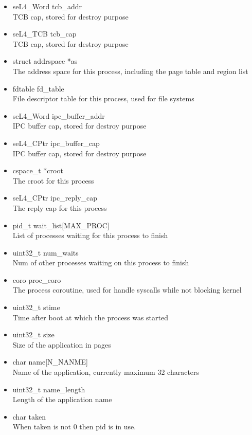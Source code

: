\documentclass[12pt]{article}
\begin{document}
\begin{itemize}
\item seL4\_Word tcb\_addr\\
TCB cap, stored for destroy purpose
\item seL4\_TCB tcb\_cap\\
TCB cap, stored for destroy purpose
\item struct addrspace *as\\
The address space for this process, including the page table and region list
\item fdtable fd\_table\\
File descriptor table for this process, used for file systems
\item seL4\_Word ipc\_buffer\_addr\\
IPC buffer cap, stored for destroy purpose
\item seL4\_CPtr ipc\_buffer\_cap\\
IPC buffer cap, stored for destroy purpose
\item cspace\_t *croot\\
The croot for this process
\item seL4\_CPtr ipc\_reply\_cap\\
The reply cap for this process
\item pid\_t wait\_list[MAX\_PROC]\\
List of processes waiting for this process to finish
\item uint32\_t num\_waits\\
Num of other processes waiting on this process to finish
\item coro proc\_coro\\
The process coroutine, used for handle syscalls while not blocking kernel
\item uint32\_t stime\\
Time after boot at which the process was started
\item uint32\_t size\\
Size of the application in pages
\item char name[N\_NANME]\\
Name of the application, currently maximum 32 characters
\item uint32\_t name\_length\\
Length of the application name
\item char taken\\
When taken is not 0 then pid is in use.
\end{itemize}
\end{document}
